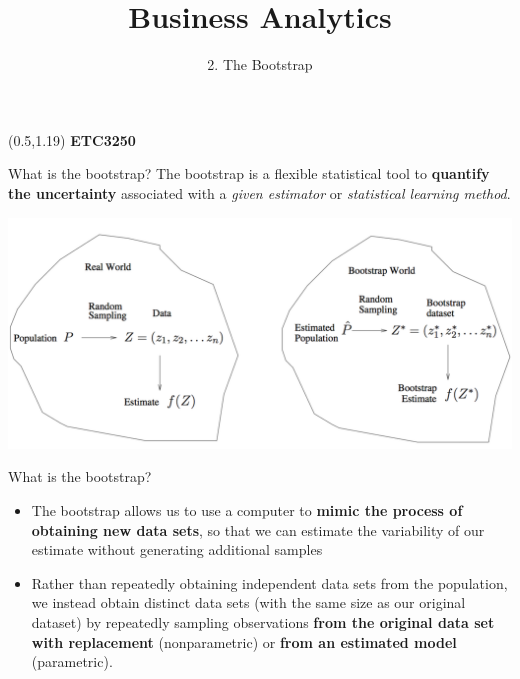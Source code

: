 \documentclass[14pt]{beamer}
\title[2. The Bootstrap]{Business Analytics}
\author{2. The Bootstrap}
\begin{document}
\begin{frame}[plain]{}
\maketitle
\begin{textblock}{11}(0.5,1.19){\color{white}\large
\textbf{ETC3250}}
\end{textblock}
\end{frame}

\begin{frame}[plain]{What is the bootstrap?}
%
The bootstrap is a flexible statistical tool to \textbf{quantify the uncertainty} associated with a \emph{given estimator} or \emph{statistical learning method}.
\begin{center}
\includegraphics[width=1\textwidth]{general-bootstrap}	
\end{center}
\end{frame}

\begin{frame}[plain]{What is the bootstrap?}

\begin{itemize}
	\item  The bootstrap allows us to use a computer to \textbf{mimic the process of obtaining new data sets}, so that we can estimate the variability of our estimate without generating additional samples
	\item Rather than repeatedly obtaining independent data sets
from the population, we instead obtain distinct data sets (with the same size as our original dataset) by repeatedly sampling observations \textbf{from the original data set with replacement} (nonparametric) or \textbf{from an estimated model} (parametric).
\end{itemize}
\end{frame}
\end{document}
